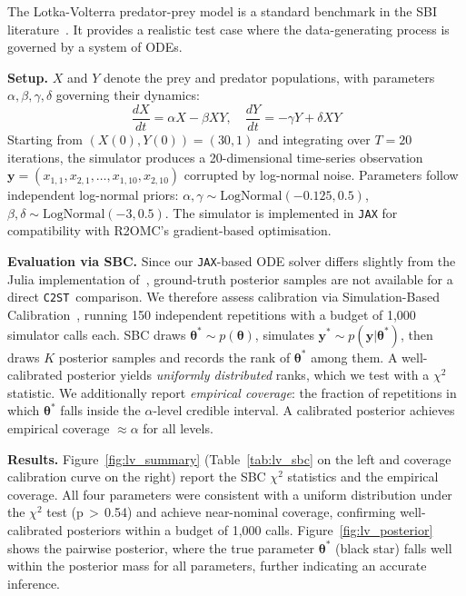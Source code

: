 \documentclass[twoside]{article}
\newcommand{\thb}{\boldsymbol{\theta}}
\newcommand{\yb}{\mathbf{y}}
\newcommand{\rromc}{R2OMC}
\newcommand{\CtwoST}{\texttt{C2ST}}
\begin{document}
The Lotka-Volterra predator-prey model is a standard benchmark in the SBI literature~\citep{lueckmann2021benchmarking}.
It provides a realistic test case where the data-generating process is governed by a system of ODEs.

\textbf{Setup.}
$X$ and $Y$ denote the prey and predator populations, with parameters $\alpha, \beta, \gamma, \delta$ governing their dynamics:
\[
\frac{dX}{dt} = \alpha X - \beta XY, \quad \frac{dY}{dt} = -\gamma Y + \delta XY
\]
Starting from $(X(0), Y(0)) = (30, 1)$ and integrating over $T = 20$ iterations,
the simulator produces a 20-dimensional time-series observation
$\yb = (x_{1,1}, x_{2,1}, \ldots, x_{1,10}, x_{2,10})$ corrupted by log-normal noise.
Parameters follow independent log-normal priors:
$\alpha, \gamma \sim \mathrm{LogNormal}(-0.125, 0.5)$,
$\beta, \delta \sim \mathrm{LogNormal}(-3, 0.5)$.
The simulator is implemented in \texttt{JAX} for compatibility with \rromc's gradient-based optimisation.

\textbf{Evaluation via SBC.}
Since our \texttt{JAX}-based ODE solver differs slightly from the Julia implementation of~\citet{lueckmann2021benchmarking},
ground-truth posterior samples are not available for a direct \CtwoST~comparison.
We therefore assess calibration via Simulation-Based Calibration~\citep[SBC,][]{hermans2021trust}, running 150 independent repetitions with a budget of 1{,}000 simulator calls each.
SBC draws $\thb^* \sim p(\thb)$, simulates $\yb^* \sim p(\yb|\thb^*)$, then draws $K$ posterior samples and records the rank of $\thb^*$ among them.
A well-calibrated posterior yields \emph{uniformly distributed} ranks, which we test with a $\chi^2$ statistic.
We additionally report \emph{empirical coverage}: the fraction of repetitions in which $\thb^*$ falls inside the $\alpha$-level credible interval. A calibrated posterior achieves empirical coverage $\approx \alpha$ for all levels.

\textbf{Results.}
Figure~\ref{fig:lv_summary}
(Table~\ref{tab:lv_sbc} on the left and coverage calibration curve on the right)
report the SBC $\chi^2$ statistics and the empirical coverage.
All four parameters were consistent with a uniform distribution under the $\chi^2$ test (p\,$>\,$0.54) and achieve near-nominal coverage, confirming well-calibrated posteriors within a budget of 1{,}000 calls.
Figure~\ref{fig:lv_posterior} shows the pairwise posterior, where the true parameter $\thb^*$ (black star) falls well within the posterior mass for all parameters, further indicating an accurate inference.
\end{document}
